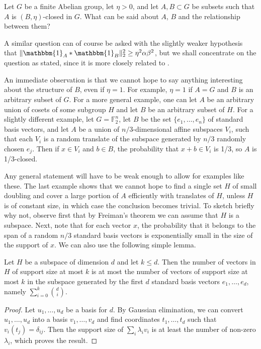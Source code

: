\documentclass{toc}
\newcommand\F{\mathbb{F}}
\renewcommand\a{\alpha}
\newcommand\be{\beta}
\renewcommand\d{\delta}
\newcommand{\ind}{\mathbbm{1}}
\renewcommand\AA{\ind_A}
\newcommand\BB{\ind_B}
\begin{document}
\begin{question} \label{generalq}
	Let $G$ be a finite Abelian group, let $\eta>0$, and let $A,B\subset G$ be subsets such that $A$ is $(B,\eta)$-closed in $G$. What can be said about $A$, $B$ and the relationship between them?
\end{question}

\noindent A similar question can of course be asked with the slightly weaker hypothesis that $\|\AA*\BB\|_2^2\geq\eta^2\a \be^2$, but we shall concentrate on the question as stated, since it is more closely related to .

An immediate observation is that we cannot hope to say anything interesting about the structure of $B$, even if $\eta=1$. For example, $\eta=1$ if $A=G$ and $B$ is an arbitrary subset of $G$. For a more general example, one can let $A$ be an arbitrary union of cosets of some subgroup $H$ and let $B$ be an arbitrary subset of $H$. For a slightly different example, let $G=\F_2^n$, let $B$ be the set $\{e_1,\dots,e_n\}$ of standard basis vectors, and let $A$ be a union of $n/3$-dimensional affine subspaces $V_i$, such that each $V_i$ is a random translate of the subspace generated by $n/3$ randomly chosen $e_j$. Then if $x\in V_i$ and $b\in B$, the probability that $x+b\in V_i$ is 1/3, so $A$ is 1/3-closed.

Any general statement will have to be weak enough to allow for examples like these. The last example shows that we cannot hope to find a single set $H$ of small doubling and cover a large portion of $A$ efficiently with translates of $H$, unless $H$ is of constant size, in which case the conclusion becomes trivial. To sketch briefly why not, observe first that by Freiman's theorem we can assume that $H$ is a subspace. Next, note that for each vector $x$, the probability that it belongs to the span of a random $n/3$ standard basis vectors is exponentially small in the size of the support of $x$. We can also use the following simple lemma.

\begin{lemma}
	Let $H$ be a subspace of dimension $d$ and let $k\leq d$. Then the number of vectors in $H$ of support size at most $k$ is at most the number of vectors of support size at most $k$ in the subspace generated by the first $d$ standard basis vectors $e_1,\dots,e_d$, namely $\sum_{i=0}^k\binom di$.
\end{lemma}

\begin{proof}
	Let $u_1,\dots,u_d$ be a basis for $d$. By Gaussian elimination, we can convert $u_1,\dots,u_d$ into a basis $v_1,\dots,v_d$ and find coordinates $t_1,\dots,t_d$ such that $v_i(t_j)=\d_{ij}$. Then the support size of $\sum_i\lambda_iv_i$ is at least the number of non-zero $\lambda_i$, which proves the result.
\end{proof}
\end{document}
